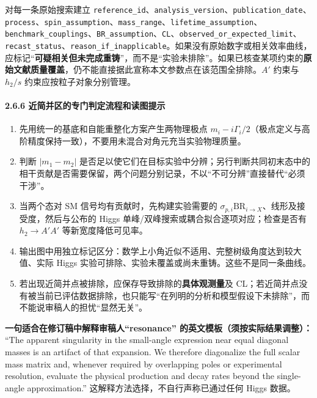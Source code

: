 \documentclass[
  chinese,
  UTF8]{ctexart}
\providecommand{\tightlist}{%
  \setlength{\itemsep}{0pt}\setlength{\parskip}{0pt}}
\begin{document}
对每一条原始搜索建立
\texttt{reference\_id}、\texttt{analysis\_version}、\texttt{publication\_date}、\texttt{process}、\texttt{spin\_assumption}、\texttt{mass\_range}、\texttt{lifetime\_assumption}、\texttt{benchmark\_couplings}、\texttt{BR\_assumption}、\texttt{CL}、\texttt{observed\_or\_expected\_limit}、\texttt{recast\_status}、\texttt{reason\_if\_inapplicable}。如果没有原始数字或相关效率曲线，应标记``\textbf{可疑相关但未完成重铸}''，而不是``实验未排除''。如果已核查某项约束的\textbf{原始文献质量覆盖}，仍不能直接据此宣称本文参数点在该范围全排除。\(A'\)
约束与 \(h_2/s\) 约束应按粒子对象分别管理。

\paragraph{2.6.6
近简并区的专门判定流程和读图提示}\label{ux8fd1ux7b80ux5e76ux533aux7684ux4e13ux95e8ux5224ux5b9aux6d41ux7a0bux548cux8bfbux56feux63d0ux793a}

\begin{enumerate}
\def\labelenumi{\arabic{enumi}.}
\tightlist
\item
  先用统一的基底和自能重整化方案产生两物理极点
  \(m_i-i\Gamma_i/2\)（极点定义与高阶精度保持一致），不要用未混合对角元充当实验物理质量。
\item
  判断 \(|m_1-m_2|\)
  是否足以使它们在目标实验中分辨；另行判断共同初末态中的相干贡献是否需要保留，两个问题分别记录，不以``不可分辨''直接替代``必须干涉''。
\item
  当两个态对 SM 信号均有贡献时，先构建实验需要的
  \(\sigma_{p,i}\mathrm{BR}_{i\to X}\)、线形及接受度，然后与公布的 Higgs
  单峰/双峰搜索或耦合拟合逐项对应；检查是否有 \(h_2\to A'A'\)
  等新宽度降低可见率。
\item
  输出图中用独立标记区分：数学上小角近似不适用、完整树级角度达到较大值、实际
  Higgs 实验可排除、实验未覆盖或尚未重铸。这些不是同一条曲线。
\item
  若出现近简并点被排除，应保存导致排除的\textbf{具体观测量}及
  CL；若近简并点没有被当前已评估数据排除，也只能写``在列明的分析和模型假设下未排除''，而不能说审稿人的担忧``显然无关''。
\end{enumerate}

\textbf{一句适合在修订稿中解释审稿人``resonance''
的英文模板（须按实际结果调整）：} ``The apparent singularity in the
small-angle expression near equal diagonal masses is an artifact of that
expansion. We therefore diagonalize the full scalar mass matrix and,
whenever required by overlapping poles or experimental resolution,
evaluate the physical production and decay rates beyond the single-angle
approximation.'' 这解释方法选择，不自行声称已通过任何 Higgs 数据。
\end{document}
